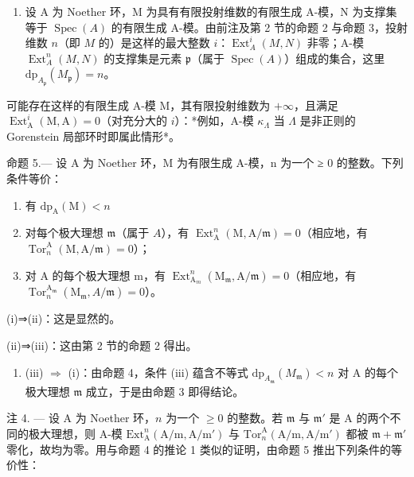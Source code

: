 \begin{enumerate}
\def\labelenumi{\arabic{enumi})}
\setcounter{enumi}{2}
\tightlist
\item
  设 A 为 Noether 环，M 为具有有限投射维数的有限生成 A-模，N 为支撑集等于 \(\operatorname{Spec}(A)\) 的有限生成 A-模。由前注及第 2 节的命题 2 与命题 3，投射维数 \(n\)（即 \(M\) 的）是这样的最大整数 \(i\)：\(\operatorname{Ext}_{A}^{i}(M,N)\) 非零；A-模 \(\operatorname{Ext}_{A}^{n}(M,N)\) 的支撑集是元素 \(\mathfrak{p}\)（属于 \(\operatorname{Spec}(A)\)）组成的集合，这里 \(\mathrm{dp}_{A_{\mathfrak{p}}}(M_{\mathfrak{p}})=n\)。
\end{enumerate}

可能存在这样的有限生成 A-模 M，其有限投射维数为 \(+\infty\)，且满足 \(\operatorname{Ext}_{\mathrm{A}}^{i}(\mathrm{M},\mathrm{A})=0\)（对充分大的 \(i\)）：*例如，A-模 \(\kappa_{\Lambda}\) 当 \(\Lambda\) 是非正则的 Gorenstein 局部环时即属此情形*。

命题 5.--- 设 A 为 Noether 环，M 为有限生成 A-模，n 为一个 ≥ 0 的整数。下列条件等价：

\begin{enumerate}
\def\labelenumi{(\roman{enumi})}
\item
  有 \(\mathrm{dp}_{\mathrm{A}}(\mathrm{M}) < n\)
\item
  对每个极大理想 \(\mathfrak{m}\)（属于 \(A\)），有 \(\operatorname{Ext}_{\mathrm{A}}^{n}(\mathrm{M},\mathrm{A}/\mathfrak{m}) = 0\)（相应地，有 \(\operatorname{Tor}_{n}^{\mathrm{A}}(\mathrm{M},\mathrm{A}/\mathfrak{m}) = 0\)）；
\item
  对 A 的每个极大理想 m，有 \(\operatorname{Ext}_{\mathrm{A}_{m}}^{n}(\mathrm{M}_{\mathfrak{m}},\mathrm{A}/\mathfrak{m})=0\)（相应地，有 \(\operatorname{Tor}_{n}^{\mathrm{A}_{\mathfrak{m}}}(\mathrm{M}_{\mathfrak{m}},A/\mathfrak{m})=0\)）。
\end{enumerate}

(i)⇒(ii)：这是显然的。

(ii)⇒(iii)：这由第 2 节的命题 2 得出。

\begin{enumerate}
\def\labelenumi{(\roman{enumi})}
\setcounter{enumi}{2}
\tightlist
\item
  (iii) \(\Rightarrow\) (i)：由命题 4，条件 (iii) 蕴含不等式 \(\mathrm{dp}_{A_{\mathfrak{m}}}(M_{\mathfrak{m}}) < n\) 对 A 的每个极大理想 \(\mathfrak{m}\) 成立，于是由命题 3 即得结论。
\end{enumerate}

注 4. — 设 A 为 Noether 环，\(n\) 为一个 \(\geqslant 0\) 的整数。若 \(\mathfrak{m}\) 与 \(\mathfrak{m}'\) 是 A 的两个不同的极大理想，则 A-模 \(\mathrm{Ext}_{\mathrm{A}}^{n}(\mathrm{A/m},\mathrm{A/m}')\) 与 \(\mathrm{Tor}_{n}^{\mathrm{A}}(\mathrm{A/m},\mathrm{A/m}')\) 都被 \(\mathfrak{m} + \mathfrak{m}'\) 零化，故均为零。用与命题 4 的推论 1 类似的证明，由命题 5 推出下列条件的等价性：


